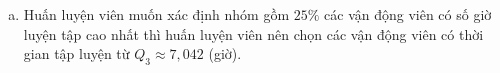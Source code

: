 \begin{vd}
{\begin{enumerate}[a)]
			Tứ phân vị thứ nhất của dãy số liệu $ x_1; x_2; \ldots ; x_{39}$ là $ x_{10}\in \left[ 2 ; 4\right) $. Do đó tứ phân vị thứ nhất của mẫu số liệu ghép nhóm là $$Q_1=2+\dfrac{\dfrac{1\cdot 39}{4}-3}{8}\cdot(4-2)=\dfrac{59}{16}\approx 3{,}6875.$$ 
			Tứ phân vị thứ ba của dãy số liệu $ x_1; x_2; \ldots ; x_{39}$ là $ x_{30}\in \left[ 6 ; 8\right) $. Do đó tứ phân vị thứ ba của mẫu số liệu ghép nhóm là $$Q_3=6+\dfrac{\dfrac{3\cdot 39}{4}-(3+8+12)}{12}\cdot(8-6)=\dfrac{169}{24}\approx 7{,}042.$$ 
			\item Huấn luyện viên muốn xác định nhóm gồm $ 25\% $ các vận động viên có số giờ luyện tập cao nhất thì huấn luyện viên nên chọn các vận động viên có thời gian tập luyện từ $ Q_3 \approx 7{,}042$ (giờ).
		\end{enumerate}
		
		
	}
\end{vd}

